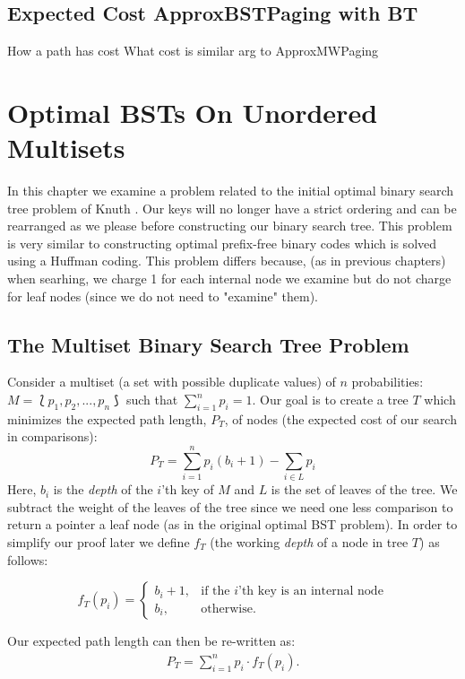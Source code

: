 \documentclass[letterpaper,12pt,titlepage,oneside,final]{book}
\theoremstyle{plain}
\begin{document}
\section{Expected Cost ApproxBSTPaging with BT}
How a path has cost
What cost is
similar arg to ApproxMWPaging

\fi

\chapter{Optimal BSTs On Unordered Multisets}\label{BST over Multisets}

In this chapter we examine a problem related to the initial optimal binary search tree problem of Knuth \cite{knuth1971optimum}. Our keys will no longer have a strict ordering and can be rearranged as we please before constructing our binary search tree. This problem is very similar to constructing optimal prefix-free binary codes which is solved using a Huffman coding. This problem differs because, (as in previous chapters) when searhing, we charge 1 for each internal node we examine but do not charge for leaf nodes (since we do not need to "examine" them).

\section{The Multiset Binary Search Tree Problem}\label{The Multiset Binary Search Tree Problem}

 Consider a multiset (a set with possible duplicate values) of $n$ probabilities: $M = \lbag p_1, p_2, ..., p_n \rbag$ such that $\sum\limits_{i=1}^n p_i = 1$. Our goal is to create a tree $T$ which minimizes the expected path length, $P_T$, of nodes (the expected cost of our search in comparisons):
\begin{equation}
P_T = \sum_{i=1}^{n} p_i(b_i+1) - \sum_{i \in L}p_i
\end{equation}
Here, $b_i$ is the \emph{depth} of the $i$'th key of $M$ and $L$ is the set of leaves of the tree. We subtract the weight of the leaves of the tree since we need one less comparison to return a pointer a leaf node (as in the original optimal BST problem). In order to simplify our proof later we define $f_T$ (the working \emph{depth} of a node in tree $T$) as follows:
\begin{center}
\[
    f_T(p_i)= 
\begin{cases}
    b_i+1,& \text{if the } i \text{'th key is an internal node}\\
    b_i,              & \text{otherwise}.
\end{cases}
\]
\end{center}
Our expected path length can then be re-written as:
\begin{align*}
P_T = \sum_{i=1}^{n} p_i\cdot f_T(p_i).
\end{align*}
\end{document}
